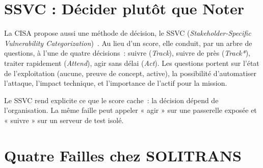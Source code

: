 \section{SSVC : Décider plutôt que Noter}
\label{sec:c09-ssvc}

La CISA propose aussi une méthode de décision, le SSVC
(\textit{Stakeholder-Specific Vulnerability Categorization})~\cite{cisa2022ssvc}.
Au lieu d'un score, elle conduit, par un arbre de questions, à l'une de
quatre décisions~: suivre (\textit{Track}), suivre de près
(\textit{Track*}), traiter rapidement (\textit{Attend}), agir sans délai
(\textit{Act}). Les questions portent sur l'état de l'exploitation (aucune,
preuve de concept, active), la possibilité d'automatiser l'attaque,
l'impact technique, et l'importance de l'actif pour la mission.

Le SSVC rend explicite ce que le score cache~: la décision dépend de
l'organisation. La même faille peut appeler « agir » sur une passerelle
exposée et « suivre » sur un serveur de test isolé.

\section{Quatre Failles chez SOLITRANS}
\label{sec:c09-solitrans}

